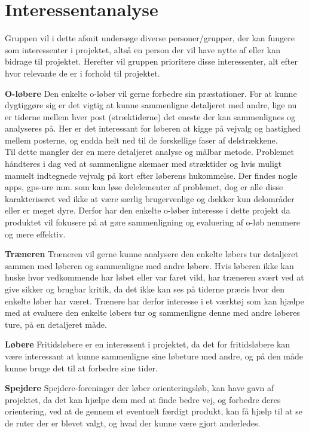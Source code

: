\section{Interessentanalyse}
Gruppen vil i dette afsnit undersøge diverse personer/grupper, der kan fungere som interessenter i projektet, altså en person der vil have nytte af eller kan bidrage til projektet. Herefter vil gruppen prioritere disse interessenter, alt efter hvor relevante de er i forhold til projektet.

\textbf{O-løbere} \newline
Den enkelte o-løber vil gerne forbedre sin præstationer. For at kunne dygtiggøre sig er det vigtig at kunne sammenligne detaljeret med andre, lige nu er tiderne mellem hver post (stræktiderne) det eneste der kan sammenlignes og analyseres på. Her er det interessant for løberen at kigge på vejvalg og hastighed mellem posterne, og endda helt ned til de forskellige faser af delstrækkene. \\
Til dette mangler der en mere detaljeret analyse og målbar metode. Problemet håndteres i dag ved at sammenligne skemaer med stræktider og hvis muligt manuelt indtegnede vejvalg på kort efter løberens hukommelse. Der findes nogle apps, gps-ure mm. som kan løse delelementer af problemet, dog er alle disse karakteriseret ved ikke at være særlig brugervenlige og dækker kun delområder eller er meget dyre. Derfor har den enkelte o-løber interesse i dette projekt da produktet vil fokusere på at gøre sammenligning og evaluering af o-løb nemmere og mere effektiv.

\textbf{Træneren}\newline
Træneren vil gerne kunne analysere den enkelte løbers tur detaljeret sammen med løberen og sammenligne med andre løbere. Hvis løberen ikke kan huske hvor vedkommende har løbet eller var faret vild, har træneren svært ved at give sikker og brugbar kritik, da det ikke kan ses på tiderne præcis hvor den enkelte løber har været. Trænere har derfor interesse i et værktøj som kan hjælpe med at evaluere den enkelte løbers tur og sammenligne denne med andre løberes ture, på en detaljeret måde.

\textbf{Løbere}\newline
Fritidsløbere er en interessent i projektet, da det for fritidsløbere kan være interessant at kunne sammenligne sine løbeture med andre, og på den måde kunne bruge det til at forbedre sine tider. 

\textbf{Spejdere}\newline
Spejdere-foreninger der løber orienteringsløb, kan have gavn af projektet, da det kan hjælpe dem med at finde bedre vej, og forbedre deres orientering, ved at de gennem et eventuelt færdigt produkt, kan få hjælp til at se de ruter der er blevet valgt, og hvad der kunne være gjort anderledes. 


